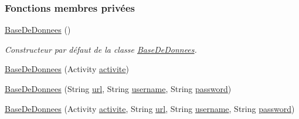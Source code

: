 \subsubsection*{Fonctions membres privées}
\begin{DoxyCompactItemize}
\item 
\hyperlink{classfr_1_1campus_1_1laurainc_1_1honeybee_1_1_base_de_donnees_ac4d0c514f439b3a19dc35c159955373a}{Base\+De\+Donnees} ()
\begin{DoxyCompactList}\small\item\em Constructeur par défaut de la classe \hyperlink{classfr_1_1campus_1_1laurainc_1_1honeybee_1_1_base_de_donnees}{Base\+De\+Donnees}. \end{DoxyCompactList}\item 
\hyperlink{classfr_1_1campus_1_1laurainc_1_1honeybee_1_1_base_de_donnees_a3023d75b636efcfbb2c6b6ac5c702c42}{Base\+De\+Donnees} (Activity \hyperlink{classfr_1_1campus_1_1laurainc_1_1honeybee_1_1_base_de_donnees_aad4fd29f29916bc4277fa16262d19431}{activite})
\item 
\hyperlink{classfr_1_1campus_1_1laurainc_1_1honeybee_1_1_base_de_donnees_a2f6274017a47cc8f331c582f9a7ad6d1}{Base\+De\+Donnees} (String \hyperlink{classfr_1_1campus_1_1laurainc_1_1honeybee_1_1_base_de_donnees_ad1d04b4da375002e91d8370b9d19918e}{url}, String \hyperlink{classfr_1_1campus_1_1laurainc_1_1honeybee_1_1_base_de_donnees_a7d1662e10f11f740155774b625ed1a87}{username}, String \hyperlink{classfr_1_1campus_1_1laurainc_1_1honeybee_1_1_base_de_donnees_af1bb604a666a7eee9edd93b6cafaf064}{password})
\item 
\hyperlink{classfr_1_1campus_1_1laurainc_1_1honeybee_1_1_base_de_donnees_ab3a19c26fc4ddbddc1d9166e88bb4db7}{Base\+De\+Donnees} (Activity \hyperlink{classfr_1_1campus_1_1laurainc_1_1honeybee_1_1_base_de_donnees_aad4fd29f29916bc4277fa16262d19431}{activite}, String \hyperlink{classfr_1_1campus_1_1laurainc_1_1honeybee_1_1_base_de_donnees_ad1d04b4da375002e91d8370b9d19918e}{url}, String \hyperlink{classfr_1_1campus_1_1laurainc_1_1honeybee_1_1_base_de_donnees_a7d1662e10f11f740155774b625ed1a87}{username}, String \hyperlink{classfr_1_1campus_1_1laurainc_1_1honeybee_1_1_base_de_donnees_af1bb604a666a7eee9edd93b6cafaf064}{password})
\end{DoxyCompactItemize}
